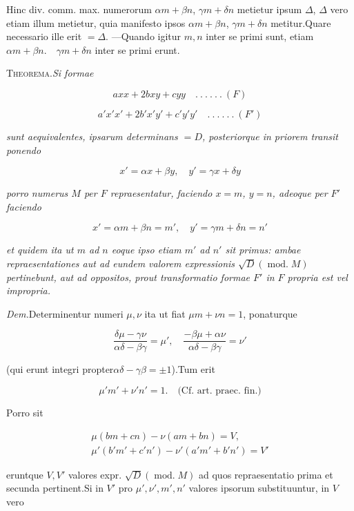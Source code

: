 Hinc div. comm. max. numerorum $\alpha m+\beta n$, $\gamma m+\delta n$ metietur ipsum $\Delta$, $\Delta$ vero etiam illum metietur, quia manifesto ipsos $\alpha m+\beta n$, $\gamma m+\delta n$ metitur.\quad Quare necessario ille erit $=\Delta.$ ---\quad Quando igitur $m,n$ inter se primi sunt, etiam $\alpha m+\beta n.\quad\gamma m+\delta n$ inter se primi erunt.


\textsc{Theorema.}\quad \emph{Si formae}

\[
axx+2bxy+cyy\quad .\ .\ .\ .\ .\ .\ (F)
\]

\[
a'x'x'+2b'x'y'+c'y'y'\quad .\ .\ .\ .\ .\ .\ (F')
\]

\emph{sunt aequivalentes, ipsarum determinans $=D$, posteriorque in priorem transit ponendo}

\[
x'=\alpha x+\beta y,\quad y'=\gamma x+\delta y
\]


\emph{porro numerus $M$ per $F$ repraesentatur, faciendo $x=m$, $y=n$, adeoque per $F'$ faciendo}

\[
x'=\alpha m+\beta n=m',\quad y'=\gamma m+\delta n=n'
\]

\emph{et quidem ita ut $m$ ad $n$ eoque ipso etiam $m'$ ad $n'$ sit primus: ambae repraesentationes aut ad eundem valorem expressionis $\surd D(\operatorname{mod.}M)$ pertinebunt, aut ad oppositos, prout transformatio formae $F'$ in $F$ propria est vel impropria.}

\emph{Dem.}\quad Determinentur numeri $\mu,\nu$ ita ut fiat $\mu m+\nu n=1$, ponaturque

\[
\frac{\delta\mu-\gamma\nu}{\alpha\delta-\beta\gamma}=\mu',\quad \frac{-\beta\mu+\alpha\nu}{\alpha\delta-\beta\gamma}=\nu'
\]

(qui erunt integri propter\quad $\alpha\delta-\gamma\beta=\pm1$).\quad Tum erit

\[
\mu'm'+\nu'n'=1.\quad\text{(Cf. art. praec. fin.)}
\]

Porro sit

\[
\begin{gathered}\mu(bm+cn)-\nu(am+bn)=V,\\\mu'(b'm'+c'n')-\nu'(a'm'+b'n')=V'\end{gathered}
\]

eruntque $V,V'$ valores expr. $\surd D(\operatorname{mod.}M)$ ad quos repraesentatio prima et secunda pertinent.\quad Si in $V'$ pro $\mu',\nu',m',n'$ valores ipsorum substituuntur, in $V$ vero


